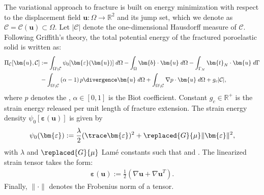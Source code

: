 
The {variational} approach to fracture is built on energy minimization with respect to the displacement field $\bm{u}:\Omega\rightarrow\mathbb{R}^2$ and its jump set, which we denote as $\mathcal{C}=\mathcal{C}(\bm{u})\subset\Omega$. Let $|\mathcal{C}|$ denote the one-dimensional Hausdorff measure of $\mathcal{C}$. {Following Griffith's theory,} the total potential energy of the fractured poroelastic solid is written as:
\begin{equation}\label{Eq:Pi}
    \begin{aligned}
        \Pi_{\mathcal{C}}[\bm{u},\mathcal{C}] &:= \int_{\Omega\setminus\mathcal{C}} \psi_0[\bm{\varepsilon}(\bm{u})] \; d\Omega
	    - \int_{\Omega} \bm{b} \cdot \bm{u} \; d\Omega
	    - \int_{\Gamma_N} \bm{t}_N\cdot \bm{u} \; d\Gamma \\
	    &- \int_{\Omega\setminus\mathcal{C}} \left(\alpha - 1\right)p\divergence\bm{u}\; d\Omega + 
	    \int_{\Omega\setminus\mathcal{C}}\nabla p\cdot \bm{u}\; d\Omega + g_c|\mathcal{C}|,\\
    \end{aligned}
\end{equation}
where $p$ denotes the , $\alpha\in[0,1]$ is the Biot coefficient. {Constant} $g_c\in\mathbb{R}^+$ is the strain energy released per unit length of fracture extension. {The strain energy density $\psi_0[\bm{\varepsilon}(\bm{u})]$ is given by}
\begin{equation}\label{Eq:Strain_Energy}
    \begin{aligned}
        \psi_0(\bm{\varepsilon}) := \frac{\lambda}{2} (\trace \bm{\varepsilon})^2 + \replaced{G}{\mu} \|\bm{\varepsilon}\|^2,
    \end{aligned}
\end{equation}
with $\lambda$ and $\replaced{G}{\mu}$ Lam\'e constants such that  and . The linearized strain tensor takes the form:
\begin{equation*}
    \begin{aligned}
        \bm{\varepsilon}(\bm{u}) := 
        \frac{1}{2}\left(\nabla\bm{u}+\nabla\bm{u}^T\right).
    \end{aligned}
\end{equation*}
Finally, $\|\cdot\|$ denotes the Frobenius norm of a tensor.

